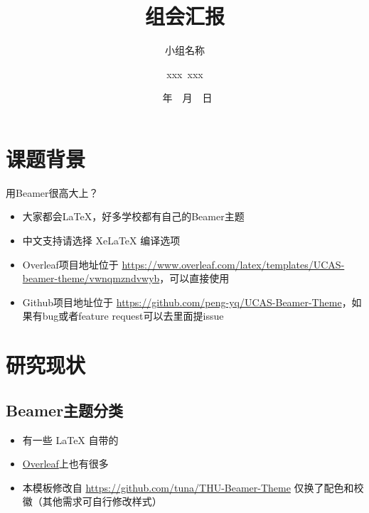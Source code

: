\documentclass[UTF8, fontset=fandol]{beamer}
\author{xxx~xxx}
\title{组会汇报}
\subtitle{小组名称}
\institute{智能与计算学部}
\date{\the\year~年~\the\month~月~\the\day~日}
\begin{document}
  \kaishu
  \begin{frame}
    \titlepage
  \end{frame}

  \begin{frame}
    \tableofcontents[sectionstyle=show,subsectionstyle=show/shaded/hide,subsubsectionstyle=show/shaded/hide]
  \end{frame}


  \section{课题背景}
  \begin{frame}{用Beamer很高大上？}
    \begin{itemize} %
      \item 大家都会\LaTeX{}，好多学校都有自己的Beamer主题
      \item 中文支持请选择 Xe\LaTeX{} 编译选项
      \item Overleaf项目地址位于 \url{https://www.overleaf.com/latex/templates/UCAS-beamer-theme/vwnqmzndvwyb}，可以直接使用
      \item Github项目地址位于 \url{https://github.com/peng-yq/UCAS-Beamer-Theme}，如果有bug或者feature request可以去里面提issue
    \end{itemize}
  \end{frame}


  \section{研究现状}

  \subsection{Beamer主题分类}

  \begin{frame}
    \begin{itemize}
      \item 有一些 \LaTeX{} 自带的
      \item \href{https://www.overleaf.com/latex/templates}{Overleaf}上也有很多
      \item 本模板修改自
        \newline
        \url{https://github.com/tuna/THU-Beamer-Theme}
        \newline
        仅换了配色和校徽（其他需求可自行修改样式）
    \end{itemize}
  \end{frame}
\end{document}
